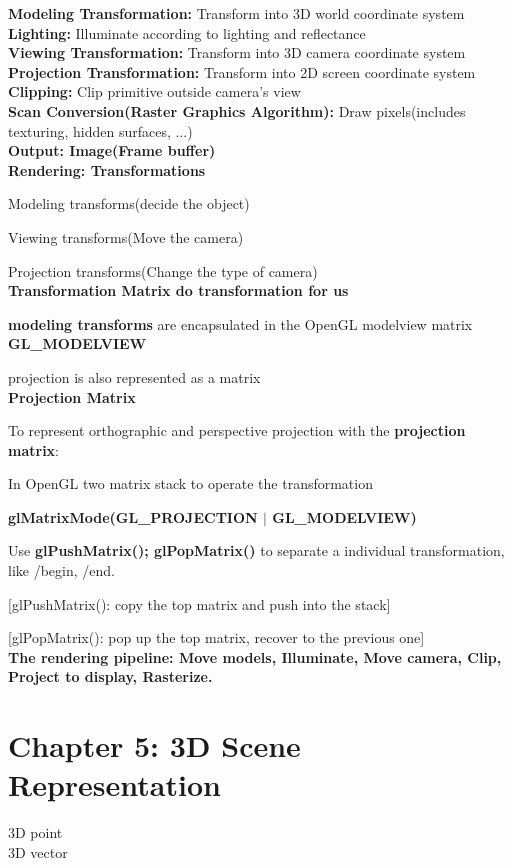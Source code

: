 \documentclass[]{report}
\begin{document}
\textbf{Modeling Transformation:} Transform into 3D world coordinate system\\

\textbf{Lighting:} Illuminate according to lighting and reflectance\\

\textbf{Viewing Transformation:} Transform into 3D camera coordinate system\\

\textbf{Projection Transformation:} Transform into 2D screen coordinate system\\

\textbf{Clipping:} Clip primitive outside camera's view\\

\textbf{Scan Conversion(Raster Graphics Algorithm):} Draw pixels(includes texturing, hidden surfaces, ...)\\
\textbf{Output: Image(Frame buffer)}\\
\textbf{Rendering: Transformations}

Modeling transforms(decide the object)

Viewing transforms(Move the camera)

Projection transforms(Change the type of camera)\\
\textbf{Transformation Matrix do transformation for us}

\textbf{modeling transforms} are encapsulated in the OpenGL modelview matrix \textbf{GL\_MODELVIEW}

projection is also represented as a matrix\\
\textbf{Projection Matrix}

To represent orthographic and perspective projection with the \textbf{projection matrix}:

In OpenGL two matrix stack to operate the transformation

\textbf{glMatrixMode(GL\_PROJECTION $|$ GL\_MODELVIEW)}

Use \textbf{glPushMatrix(); glPopMatrix()} to separate a individual transformation, like /begin, /end.

[glPushMatrix(): copy the top matrix and push into the stack]

[glPopMatrix(): pop up the top matrix, recover to the previous one]\\
\textbf{The rendering pipeline: Move models, Illuminate, Move camera, Clip, Project to display, Rasterize.}


\section*{Chapter 5: 3D Scene Representation}
3D point\\
3D vector
\end{document}
